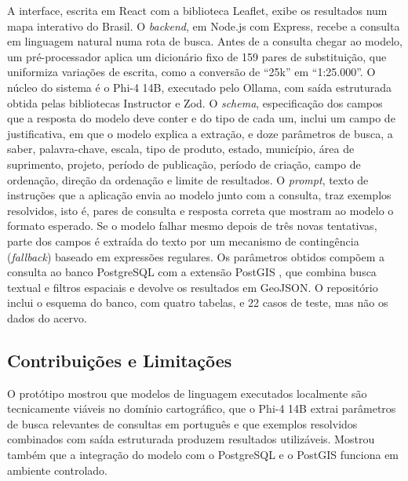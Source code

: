 A interface, escrita em React com a biblioteca Leaflet, exibe os resultados num mapa interativo do Brasil. O \textit{backend}, em Node.js com Express, recebe a consulta em linguagem natural numa rota de busca. Antes de a consulta chegar ao modelo, um pré-processador aplica um dicionário fixo de 159 pares de substituição, que uniformiza variações de escrita, como a conversão de ``25k'' em ``1:25.000''. O núcleo do sistema é o Phi-4 14B, executado pelo Ollama, com saída estruturada obtida pelas bibliotecas Instructor \cite{instructor2023} e Zod. O \textit{schema}, especificação dos campos que a resposta do modelo deve conter e do tipo de cada um, inclui um campo de justificativa, em que o modelo explica a extração, e doze parâmetros de busca, a saber, palavra-chave, escala, tipo de produto, estado, município, área de suprimento, projeto, período de publicação, período de criação, campo de ordenação, direção da ordenação e limite de resultados. O \textit{prompt}, texto de instruções que a aplicação envia ao modelo junto com a consulta, traz exemplos resolvidos, isto é, pares de consulta e resposta correta que mostram ao modelo o formato esperado. Se o modelo falhar mesmo depois de três novas tentativas, parte dos campos é extraída do texto por um mecanismo de contingência (\textit{fallback}) baseado em expressões regulares. Os parâmetros obtidos compõem a consulta ao banco PostgreSQL com a extensão PostGIS \cite{postgis2001}, que combina busca textual e filtros espaciais e devolve os resultados em GeoJSON. O repositório inclui o esquema do banco, com quatro tabelas, e 22 casos de teste, mas não os dados do acervo.

\subsection{Contribuições e Limitações}
\label{sec:prototipo-limitacoes}

O protótipo mostrou que modelos de linguagem executados localmente são tecnicamente viáveis no domínio cartográfico, que o Phi-4 14B extrai parâmetros de busca relevantes de consultas em português e que exemplos resolvidos combinados com saída estruturada produzem resultados utilizáveis. Mostrou também que a integração do modelo com o PostgreSQL e o PostGIS funciona em ambiente controlado.

